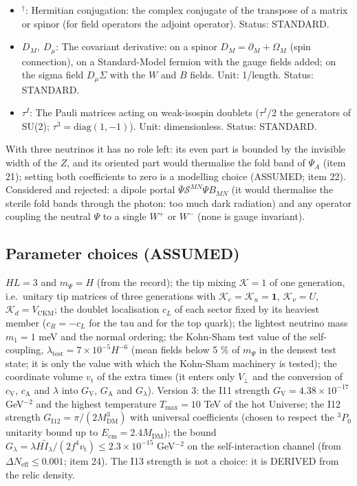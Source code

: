\documentclass[
  10pt,
]{article}
\begin{document}
\begin{itemize}
  dimensionless. Status: INVENTED.
\item
  \({}^\dagger\): Hermitian conjugation: the complex conjugate of the
  transpose of a matrix or spinor (for field operators the adjoint
  operator). Status: STANDARD.
\item
  \(D_M,\ D_\mu\): The covariant derivative: on a spinor
  \(D_M = \partial_M + \Omega_M\) (spin connection), on a Standard-Model
  fermion with the gauge fields added; on the sigma field
  \(D_\mu\Sigma\) with the \(W\) and \(B\) fields. Unit: 1/length.
  Status: STANDARD.
\item
  \(\tau^I\): The Pauli matrices acting on weak-isospin doublets
  (\(\tau^I/2\) the generators of SU(2);
  \(\tau^3 = \mathrm{diag}(1, -1)\)). Unit: dimensionless. Status:
  STANDARD.
\end{itemize}

With three neutrinos it has no role left: its even part is bounded by
the invisible width of the \(Z\), and its oriented part would thermalise
the fold band of \(\Psi_A\) (item 21); setting both coefficients to zero
is a modelling choice (ASSUMED; item 22). Considered and rejected: a
dipole portal \(\bar\Psi\mathcal{S}^{MN}\Psi B_{MN}\) (it would
thermalise the sterile fold bands through the photon: too much dark
radiation) and any operator coupling the neutral \(\Psi\) to a single
\(W^+\) or \(W^-\) (none is gauge invariant).

\hypertarget{parameter-choices-assumed}{%
\subsection{Parameter choices
(ASSUMED)}\label{parameter-choices-assumed}}

\(HL = 3\) and \(m_\Psi = H\) (from the record); the tip mixing
\(\mathcal{K} = 1\) of one generation, i.e.~unitary tip matrices of
three generations with \(\mathcal{K}_e = \mathcal{K}_u = \mathbf{1}\),
\(\mathcal{K}_\nu = U\), \(\mathcal{K}_d = V_{\mathrm{CKM}}\); the
doublet localisation \(c_L\) of each sector fixed by its heaviest member
(\(c_R = -c_L\) for the tau and for the top quark); the lightest
neutrino mass \(m_1 = 1\) meV and the normal ordering; the Kohn-Sham
test value of the self-coupling,
\(\lambda_{\mathrm{test}} = 7\times10^{-5}H^{-6}\) (mean fields below 5
\% of \(m_\Psi\) in the densest test state; it is only the value with
which the Kohn-Sham machinery is tested); the coordinate volume
\(v_{\mathrm{t}}\) of the extra times (it enters only \(V_\perp\) and
the conversion of \(c_{\mathrm{V}}\), \(c_{\mathrm{A}}\) and \(\lambda\)
into \(G_{\mathrm{V}}\), \(G_{\mathrm{A}}\) and \(G_\lambda\)). Version
3: the I11 strength \(G_{\mathrm{V}} = 4.38\times10^{-17}\) GeV\(^{-2}\)
and the highest temperature \(T_{\mathrm{max}} = 10\) TeV of the hot
Universe; the I12 strength
\(G_{\mathrm{I12}} = \pi/(2M_{\mathrm{DM}}^3)\) with universal
coefficients (chosen to respect the \(^3P_0\) unitarity bound up to
\(E_{\mathrm{cm}} = 2.4M_{\mathrm{DM}}\)); the bound
\(G_\lambda = \lambda H\tilde I_\lambda/(2f^4v_{\mathrm{t}}) \le 2.3\times10^{-15}\)
GeV\(^{-2}\) on the self-interaction channel (from
\(\Delta N_{\mathrm{eff}} \le 0.001\); item 24). The I13 strength is not
a choice: it is DERIVED from the relic density.
\end{document}
